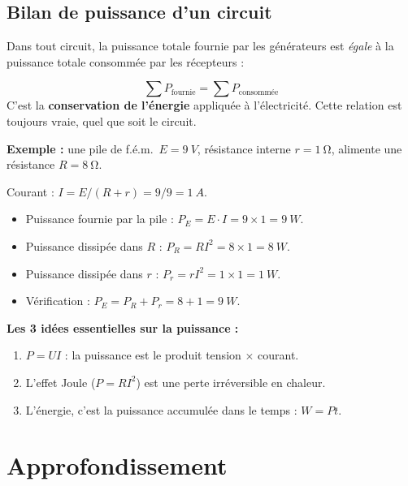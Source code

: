 \documentclass[12pt,a4paper,twoside]{book}
\begin{document}
\subsection{Bilan de puissance d'un circuit}

Dans tout circuit, la puissance totale fournie par les générateurs est \textit{égale} à la puissance totale consommée par les récepteurs :

\begin{formule}
\[
\boxed{\sum P_{\text{fournie}} = \sum P_{\text{consommée}}}
\]
C'est la \textbf{conservation de l'énergie} appliquée à l'électricité. Cette relation est toujours vraie, quel que soit le circuit.
\end{formule}

\textbf{Exemple :} une pile de f.é.m.\ $E = \SI{9}{V}$, résistance interne $r = \SI{1}{\ohm}$, alimente une résistance $R = \SI{8}{\ohm}$.

Courant : $I = E/(R+r) = 9/9 = \SI{1}{A}$.

\begin{itemize}[nosep]
\item Puissance fournie par la pile : $P_E = E \cdot I = 9 \times 1 = \SI{9}{W}$.
\item Puissance dissipée dans $R$ : $P_R = RI^2 = 8 \times 1 = \SI{8}{W}$.
\item Puissance dissipée dans $r$ : $P_r = rI^2 = 1 \times 1 = \SI{1}{W}$.
\item Vérification : $P_E = P_R + P_r = 8 + 1 = \SI{9}{W}$. \checkmark
\end{itemize}

\begin{retenir}
\textbf{Les 3 idées essentielles sur la puissance :}
\begin{enumerate}[nosep]
\item $P = UI$ : la puissance est le produit tension $\times$ courant.
\item L'effet Joule ($P = RI^2$) est une perte irréversible en chaleur.
\item L'énergie, c'est la puissance accumulée dans le temps : $W = Pt$.
\end{enumerate}
\end{retenir}

\section{Approfondissement}
\end{document}
